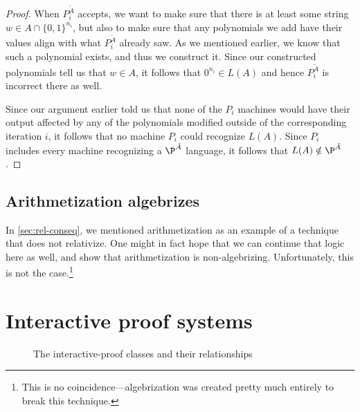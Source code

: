 \documentclass[english,12pt]{reedthesis}
\theoremstyle{plain}
\theoremstyle{definition}
\theoremstyle{remark}
\begin{document}
\begin{proof}
  When $P_{i}^{\tilde{A}}$ accepts, we want to make sure that there is at least
  some string $w \in A \cap \{0, 1\}^{n_{i}}$, but also to make sure that any
  polynomials we add have their values align with what $P_{i}^{\tilde{A}}$
  already saw. As we mentioned earlier, we know that such a polynomial exists,
  and thus we construct it. Since our constructed polynomials tell us that
  $w \in A$, it follows that $0^{n_{i}} \in L(A)$ and hence $P_{i}^{\tilde{A}}$ is
  incorrect there as well.

  Since our argument earlier told us that none of the $P_{i}$ machines would
  have their output affected by any of the polynomials modified outside of the
  corresponding iteration $i$, it follows that no machine $P_{i}$ could
  recognize $L(A)$. Since $P_{i}$ includes every machine recognizing a
  $\P^{\tilde{A}}$ language, it follows that $L(A) \notin \P^{\tilde{A}}$.
\end{proof}

\section{Arithmetization algebrizes}\label{sec:arith-algebrizes}

In \cref{sec:rel-conseq}, we mentioned arithmetization as an example of a
technique that does not relativize. One might in fact hope that we can continue
that logic here as well, and show that arithmetization is non-algebrizing.
Unfortunately, this is not the case.\footnote{This is no
  coincidence---algebrization was created pretty much entirely to break this
  technique.}

\chapter{Interactive proof systems}\label{chap:ips}

\begin{figure}[htbp]
  \centering
  \caption{The interactive-proof classes and their
    relationships}\label{fig:ip-class-venn}
\end{figure}
\end{document}
